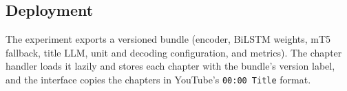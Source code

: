 \subsection*{Deployment}

The experiment exports a versioned bundle (encoder, BiLSTM weights, mT5 fallback, title LLM, unit and decoding configuration, and metrics). The chapter handler loads it lazily and stores each chapter with the bundle's version label, and the interface copies the chapters in YouTube's \texttt{00:00 Title} format.
